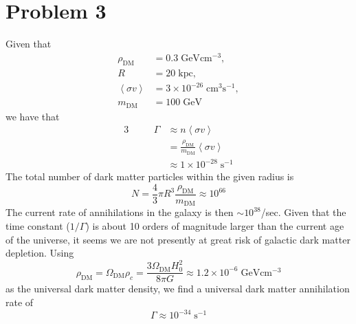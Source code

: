 \documentclass[12pt]{article}
\begin{document}
\section*{Problem 3}
Given that
\begin{align*}
    \rho_\text{DM} &= 0.3\;\text{GeV}\text{cm}^{-3}, \\
    R &= 20\;\text{kpc}, \\
    \left<\sigma v\right> &= 3\times10^{-26}\;\text{cm}^3\text{s}^{-1}, \\
    m_\text{DM} &= 100\;\text{GeV}
\end{align*}
we have that
\begin{alignat*}{3}
    & \quad & \Gamma &\approx n \left<\sigma v\right> \\
    & \quad &        &= \frac{\rho_\text{DM}}{m_\text{DM}}\left<\sigma v\right> \\
    & \quad &        &\approx  1\times10^{-28}\;\text{s}^{-1}
\end{alignat*}
The total number of dark matter particles within the given radius is
\[ N = \frac{4}{3}\pi R^3 \frac{\rho_\text{DM}}{m_\text{DM}} \approx 10^{66} \]
The current rate of annihilations in the galaxy is then $\sim10^{38}$/sec. Given that the time constant ($1/\Gamma$) is about 10 orders of magnitude larger than the current age of the universe, it seems we are not presently at great risk of galactic dark matter depletion.
Using
\[ \rho_\text{DM} = \Omega_\text{DM} \rho_c = \frac{3\Omega_\text{DM}H_0^2}{8\pi G} \approx 1.2\times10^{-6}\;\text{GeV}\text{cm}^{-3} \]
as the universal dark matter density, we find a universal dark matter annihilation rate of
\[ \Gamma \approx 10^{-34}\;\text{s}^{-1} \]
\end{document}
